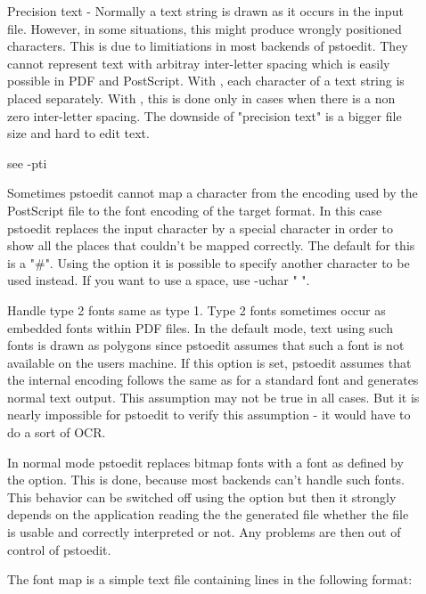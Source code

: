 \documentclass[english,a4paper]{article}
\begin{document}
\begin{description}
\item[] 
Precision text - Normally a text string is drawn as it occurs in the input file. However, in some situations, this might produce wrongly positioned characters. This is due to limitiations in most backends of pstoedit. They cannot represent text with arbitray inter-letter spacing which is easily possible in PDF and PostScript. With , each character of a text string is placed separately. With , this is done only in cases when there is a non zero inter-letter spacing. The downside of "precision text" is a bigger file size and hard to edit text.


\item[] 
see -pti


\item[] 
Sometimes pstoedit cannot map a character from the encoding used by the PostScript file to the font encoding of the target format. In this case pstoedit replaces the input character by a special character in order to show all the places that couldn't be mapped correctly. The default for this is a "\#". Using the  option it is possible to specify another character to be used instead. If you want to use a space, use -uchar " ".


\item[] 
Handle type 2 fonts same as type 1. Type 2 fonts sometimes occur as embedded fonts within PDF files. In the default mode, text using such fonts is drawn as polygons since pstoedit assumes that such a font is not available on the users machine. If this option is set, pstoedit assumes that the internal encoding follows the same as for a standard font and generates normal text output. This assumption may not be true in all cases. But it is nearly impossible for pstoedit to verify this assumption - it would have to do a sort of OCR.


\item[] 
In normal mode pstoedit replaces bitmap fonts with a font as defined by the  option. This is done, because most backends can't handle such fonts. This behavior can be switched off using the  option but then it strongly depends on the application reading the the generated file whether the file is usable and correctly interpreted or not. Any problems are then out of control of pstoedit.


\item[] 
The font map is a simple text file containing lines in the following format:\\  
 


\end{description}
\end{document}
